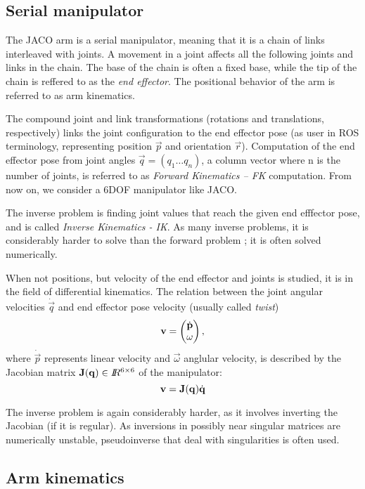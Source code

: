 \documentclass[buriama8_dp.tex]{subfiles}
\begin{document}
\subsection{Serial manipulator}
\label{subsec:arm_theory}

The JACO arm is a serial manipulator, meaning that it is a chain of links interleaved with joints. A movement in a joint affects all the following joints and links in the chain. The base of the chain is often a fixed base, while the tip of the chain is reffered to as the \emph{end effector}. The positional behavior of the arm is referred to as arm kinematics.

The compound joint and link transformations (rotations and translations, respectively) links the joint configuration to the end effector pose (as user in ROS terminology, representing position \(\vec p\) and orientation \(\vec r\)). Computation of the end effector pose from joint angles \(\vec q = (q_1 \ldots q_n)\), a column vector where \m n is the number of joints, is referred to as \emph{Forward Kinematics -- FK} computation. From now on, we consider a 6DOF manipulator like JACO.

The inverse problem is finding joint values that reach the given end efffector pose, and is called \emph{Inverse Kinematics - IK}. As many inverse problems, it is considerably harder to solve than the forward problem \cite[sec. 2.12]{manipulators}; it is often solved numerically.

When not positions, but velocity of the end effector and joints is studied, it is in the field of differential kinematics. The relation between the joint angular velocities \(\dot{\vec q}\) and end effector pose velocity (usually called \emph{twist})
\[\vec v = \colvec{\dot{\vec p}}{\vec \omega},\]
where \(\dot{\vec p}\) represents linear velocity and \(\vec \omega\) anglular velocity, is described by the Jacobian matrix \(\mathbf{J}(\mathbf{q}) \in I\!\!R^{6 \times 6}\) of the manipulator:
\[
  \mathbf{v} = \mathbf{J}(\mathbf{q})\dot{\mathbf{q}}
\]

The inverse problem is again considerably harder, as it involves inverting the Jacobian (if it is regular). As inversions in possibly near singular matrices are numerically unstable, pseudoinverse that deal with singularities is often used.

\subsection{Arm kinematics}
\label{subsec:arm_kinematics}
\end{document}
